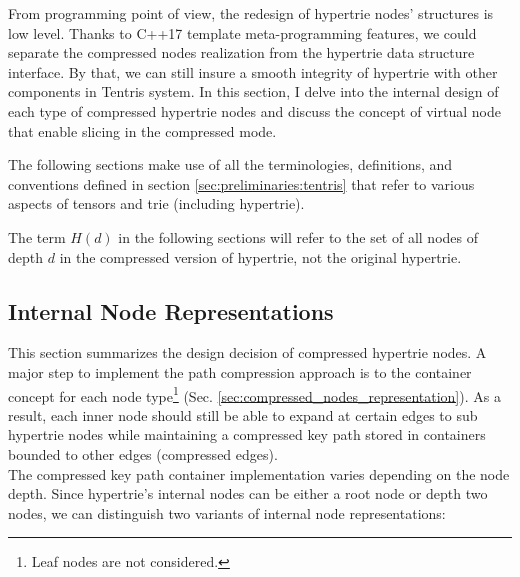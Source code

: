 From programming point of view, the redesign of hypertrie nodes' structures is low level. Thanks to C++17 template meta-programming features, we could separate the compressed nodes realization from the hypertrie data structure interface. By that, we can still insure a smooth integrity of hypertrie with other components in Tentris system. In this section, I delve into the internal design of each type of compressed hypertrie nodes and discuss the concept of virtual node that enable slicing in the compressed mode. \\
\begin{remark}
The following sections make use of all the terminologies, definitions, and conventions defined in section \ref{sec:preliminaries:tentris} that refer to various aspects of tensors and trie (including hypertrie).
\end{remark}

\begin{remark}
	The term $H(d)$ in the following sections will refer to the set of all nodes of depth $d$ in the compressed version of hypertrie, not the original hypertrie.
\end{remark}


\subsection{Internal Node Representations}
\label{ch:approach_node_structure}
This section summarizes the design decision of compressed hypertrie nodes. A major step to implement the path compression approach is to the container concept for each node type\footnote{Leaf nodes are not considered.} (Sec. \ref{sec:compressed_nodes_representation}).
As a result, each inner node should still be able to expand at certain edges to sub hypertrie nodes while maintaining a compressed key path stored in containers bounded to other edges (compressed edges). \\

The compressed key path container implementation varies depending on the node depth. Since hypertrie's internal nodes can be either a root node or depth two nodes, we can distinguish two variants of internal node representations: \\


